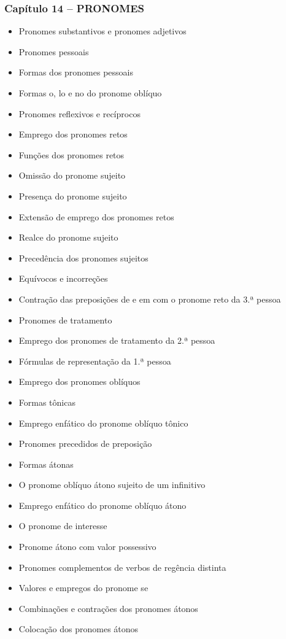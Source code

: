 \documentclass[a4paper,12pt]{article}[abntex2]
\begin{document}
\subsubsection*{Capítulo 14 – PRONOMES}
\begin{itemize}
    \item Pronomes substantivos e pronomes adjetivos
    \item Pronomes pessoais
    \item Formas dos pronomes pessoais
    \item Formas o, lo e no do pronome oblíquo
    \item Pronomes reflexivos e recíprocos
    \item Emprego dos pronomes retos
    \item Funções dos pronomes retos
    \item Omissão do pronome sujeito
    \item Presença do pronome sujeito
    \item Extensão de emprego dos pronomes retos
    \item Realce do pronome sujeito
    \item Precedência dos pronomes sujeitos
    \item Equívocos e incorreções
    \item Contração das preposições de e em com o pronome reto da 3.ª pessoa
    \item Pronomes de tratamento
    \item Emprego dos pronomes de tratamento da 2.ª pessoa
    \item Fórmulas de representação da 1.ª pessoa
    \item Emprego dos pronomes oblíquos
    \item Formas tônicas
    \item Emprego enfático do pronome oblíquo tônico
    \item Pronomes precedidos de preposição
    \item Formas átonas
    \item O pronome oblíquo átono sujeito de um infinitivo
    \item Emprego enfático do pronome oblíquo átono
    \item O pronome de interesse
    \item Pronome átono com valor possessivo
    \item Pronomes complementos de verbos de regência distinta
    \item Valores e empregos do pronome se
    \item Combinações e contrações dos pronomes átonos
    \item Colocação dos pronomes átonos
\end{itemize}
\end{document}
